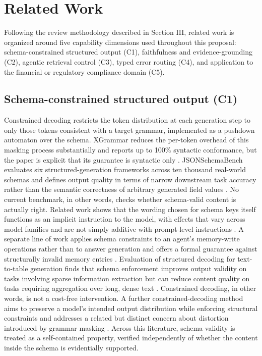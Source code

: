 \documentclass[10pt,twocolumn,letterpaper]{article}
\begin{document}
\section{Related Work}

Following the review methodology described in Section III, related work is organized around five capability dimensions used throughout this proposal: schema-constrained structured output (C1), faithfulness and evidence-grounding (C2), agentic retrieval control (C3), typed error routing (C4), and application to the financial or regulatory compliance domain (C5).

\subsection{Schema-constrained structured output (C1)}

Constrained decoding restricts the token distribution at each generation step to only those tokens consistent with a target grammar, implemented as a pushdown automaton over the schema. XGrammar reduces the per-token overhead of this masking process substantially and reports up to 100\% syntactic conformance, but the paper is explicit that its guarantee is syntactic only \cite{xgrammar}. JSONSchemaBench evaluates six structured-generation frameworks across ten thousand real-world schemas and defines output quality in terms of narrow downstream task accuracy rather than the semantic correctness of arbitrary generated field values \cite{jsonbench}. No current benchmark, in other words, checks whether schema-valid content is actually right. Related work shows that the wording chosen for schema keys itself functions as an implicit instruction to the model, with effects that vary across model families and are not simply additive with prompt-level instructions \cite{schemakey}. A separate line of work applies schema constraints to an agent's memory-write operations rather than to answer generation and offers a formal guarantee against structurally invalid memory entries \cite{agentmem}. Evaluation of structured decoding for text-to-table generation finds that schema enforcement improves output validity on tasks involving sparse information extraction but can reduce content quality on tasks requiring aggregation over long, dense text \cite{text2table}. Constrained decoding, in other words, is not a cost-free intervention. A further constrained-decoding method aims to preserve a model's intended output distribution while enforcing structural constraints and addresses a related but distinct concern about distortion introduced by grammar masking \cite{adaptrack}. Across this literature, schema validity is treated as a self-contained property, verified independently of whether the content inside the schema is evidentially supported.
\end{document}
